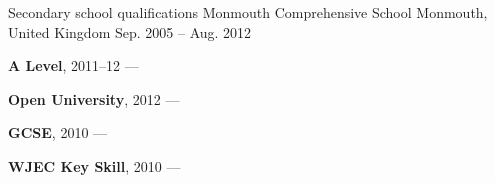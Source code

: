 \begin{cventries}
    \cventry
        {Secondary school qualifications}
        {Monmouth Comprehensive School}
        {Monmouth, United Kingdom}
        {Sep. 2005 -- Aug. 2012}
        {
        \begin{cvitems}
            \item {\textbf{A Level}, 2011--12 --- }
            \vspace{0.5mm}
            \item {\textbf{Open University}, 2012 --- }
            \vspace{0.5mm}
            \item {\textbf{GCSE}, 2010 --- }
            \vspace{0.5mm}
            \item {\textbf{WJEC Key Skill}, 2010 --- }
        \end{cvitems}
        }
\end{cventries}
